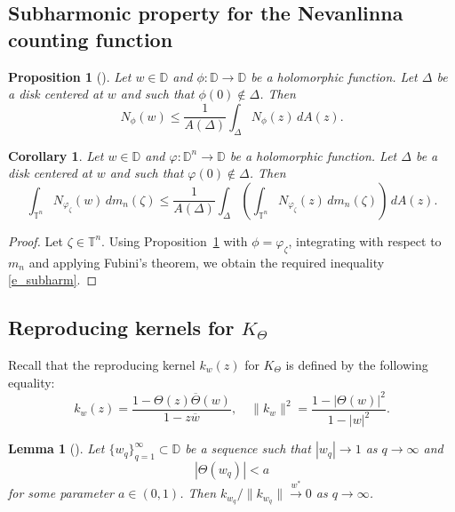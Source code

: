 \documentclass{amsart}
\numberwithin{equation}{section}
\newtheorem{proposition}[theorem]{Proposition}
\newtheorem{corollary}[theorem]{Corollary}
\newtheorem{lemma}[theorem]{Lemma}
\theoremstyle{definition}
\newcommand{\neva}{N}
\newcommand{\aream}{A}
\newcommand{\meal}{m_n}
\newcommand{\diin}{\Theta}
\newcommand{\za}{\zeta}
\newcommand{\ph}{\varphi}
\newcommand{\Dbb}{\mathbb D}
\newcommand{\tn}{\mathbb{T}^n}
\newcommand{\dn}{\mathbb{D}^n}
\newcommand{\knl}{k}
\begin{document}
\subsection{Subharmonic property for the Nevanlinna counting function}

\begin{proposition}[{\cite[Section 4.6]{ShJoel87}}]\label{p_subharm}
Let $w\in\Dbb$ and $\phi: \Dbb\to\Dbb$ be a holomorphic function.
Let $\Delta$ be a disk centered at $w$ and such that $\phi(0)\notin \Delta$.
Then
\begin{equation}\label{e_subharm_1}
\neva_{\phi}(w) \le \frac{1}{\aream(\Delta)}\int_{\Delta} \neva_\phi(z)\, d\aream(z).
\end{equation}
\end{proposition}

\begin{corollary}\label{c_subharm}
Let $w\in\Dbb$ and $\ph: \dn\to\Dbb$ be a holomorphic function.
Let $\Delta$ be a disk centered at $w$ and such that $\ph(0)\notin \Delta$.
Then
\begin{equation}\label{e_subharm}
\int_{\tn} \neva_{\ph_\za}(w)\,d\meal(\za) \le \frac{1}{\aream(\Delta)}\int_{\Delta}
\left(\int_{\tn} \neva_{\ph_\za}(z)\,  d\meal(\za) \right)\, d\aream(z).
\end{equation}
\end{corollary}
\begin{proof}
Let $\za\in \tn$.
Using Proposition~\ref{p_subharm} with $\phi = \ph_\za$,
integrating with respect to $\meal$ and applying Fubini's theorem, we obtain the required
inequality \eqref{e_subharm}.
\end{proof}

\subsection{Reproducing kernels for $K_\diin$}

Recall that the reproducing kernel $\knl_w(z)$ for $K_\diin$ is defined by the following equality:
\[
\knl_w(z) = \frac{1-\diin(z)\overline{\diin}(w)}{1- z\overline{w}}, \quad
\|\knl_w\|^2 = \frac{1-|\diin(w)|^2}{1-|w|^2}.
\]


\begin{lemma}[{\cite[Lemma~1]{LM13}}]\label{l_LM}
Let $\{w_q\}_{q=1}^\infty \subset\Dbb$ be a sequence such that $|w_q|\to 1$ as $q\to \infty$ and
\begin{equation}\label{e_LM}
|\diin (w_q)| < a
\end{equation}
for some parameter $a\in (0,1)$. Then
$\knl_{w_q}/\|\knl_{w_q}\| \overset{w^\ast}\longrightarrow 0$ as $q\to \infty$.
\end{lemma}
\end{document}
